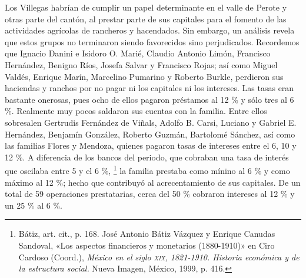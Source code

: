 \documentclass[14pt,twoside,final]{extbook} %
\let\oldfootnote\footnote
\renewcommand\footnote[1]{%
\oldfootnote{\hspace{1mm}#1}}
\begin{document}
Los Villegas habrían de cumplir un papel determinante en el valle de Perote y otras parte del cantón, al prestar parte de sus capitales para el fomento de las actividades agrícolas de rancheros y hacendados. Sin embargo, un análisis revela que estos grupos no terminaron siendo favorecidos sino perjudicados. Recordemos que Ignacio Danini e Isidoro O. Marié, Claudio Antonio Limón, Francisco Hernández, Benigno Ríos, Josefa Salvar y Francisco Rojas; así como Miguel Valdés, Enrique Marín, Marcelino Pumarino y Roberto Burkle, perdieron sus haciendas y ranchos por no pagar ni los capitales ni los intereses. Las tasas eran bastante onerosas, pues ocho de ellos pagaron préstamos al 12 \% y sólo tres al 6 \%. Realmente muy pocos saldaron sus cuentas con la familia. Entre ellos sobresalen Gertrudis Fernández de Viñals, Adolfo B. Carsi, Luciano y Gabriel E. Hernández, Benjamín González, Roberto Guzmán, Bartolomé Sánchez, así como las familias Flores y Mendoza, quienes pagaron tasas de intereses entre el 6, 10 y 12 \%. A diferencia de los bancos del periodo, que cobraban una tasa de interés que oscilaba entre 5 y el 6 \%,\footnote{Bátiz, art. cit., p. 168. José Antonio Bátiz Vázquez y Enrique Canudas Sandoval, «Los aspectos financieros y monetarios (1880-1910)» en Ciro Cardoso (Coord.), \emph{México en el siglo \textsc{xix}, 1821-1910. Historia económica y de la estructura social.} Nueva Imagen, México, 1999, p. 416.} la familia prestaba como mínino al 6 \% y como máximo al 12 \%; hecho que contribuyó al acrecentamiento de sus capitales. De un total de 59 operaciones prestatarias, cerca del 50 \% cobraron intereses al 12 \% y un 25 \% al 6 \%.
\end{document}
